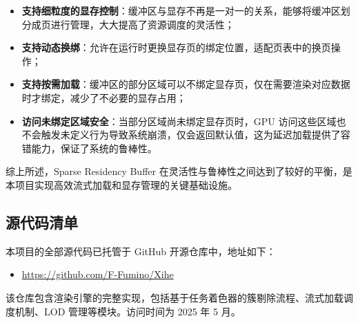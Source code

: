 {    \begin{itemize}
        \item \textbf{支持细粒度的显存控制}：缓冲区与显存不再是一对一的关系，能够将缓冲区划分成页进行管理，大大提高了资源调度的灵活性；
        
        \item \textbf{支持动态换绑}：允许在运行时更换显存页的绑定位置，适配页表中的换页操作；

        \item \textbf{支持按需加载}：缓冲区的部分区域可以不绑定显存页，仅在需要渲染对应数据时才绑定，减少了不必要的显存占用；
        
        \item \textbf{访问未绑定区域安全}：当部分区域尚未绑定显存页时，GPU 访问这些区域也不会触发未定义行为导致系统崩溃，仅会返回默认值，这为延迟加载提供了容错能力，保证了系统的鲁棒性。
    \end{itemize}

    综上所述，Sparse Residency Buffer 在灵活性与鲁棒性之间达到了较好的平衡，是本项目实现高效流式加载和显存管理的关键基础设施。

    \subsection{源代码清单}

    本项目的全部源代码已托管于 GitHub 开源仓库中，地址如下：

    \begin{itemize}
    \item \url{https://github.com/F-Fumino/Xihe}
    \end{itemize}

    该仓库包含渲染引擎的完整实现，包括基于任务着色器的簇剔除流程、流式加载调度机制、LOD 管理等模块。访问时间为 2025 年 5 月。

    \removeappendixsubsecmajornumbering
}